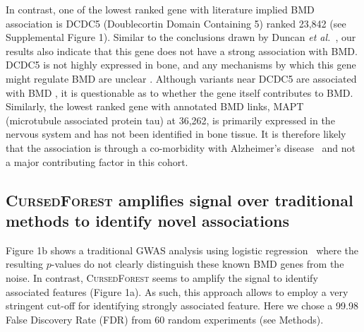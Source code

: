 \documentclass[10pt,letterpaper]{article}
\newcommand{\cursedforest}{\textsc{CursedForest}\xspace}
\begin{document}
In contrast, one of the lowest ranked gene with literature implied BMD association is DCDC5 (Doublecortin Domain Containing 5) ranked 23,842
(see Supplemental Figure 1). Similar to the conclusions drawn by Duncan {\it et
  al.}~\cite{Duncan.2011}, our results also indicate that this gene does not have a strong association with BMD. DCDC5 is not highly expressed in bone, and any mechanisms by which this gene might regulate BMD are unclear
\cite{Thakker2012}.  Although variants near DCDC5 are associated with BMD \cite{Rivadeneira2009}, it is questionable as
to whether the gene itself contributes to BMD.
Similarly, the lowest ranked gene with annotated BMD links, MAPT (microtubule associated protein tau) at 36,262, is primarily expressed in the nervous system and has not been identified in bone tissue. 
It is therefore likely that the association is through a co-morbidity with Alzheimer's disease~\cite{Dengler-Crish2017} and not a major contributing factor in this cohort. 


\subsection{\cursedforest amplifies signal over traditional methods to identify novel associations}

Figure 1b shows a traditional GWAS analysis using logistic regression~\cite{Duncan.2011} where the resulting $p$-values do not clearly distinguish these known BMD genes from the noise. 
In contrast, \cursedforest seems to amplify the signal to identify associated features (Figure 1a). 
As such, this approach allows to employ a very stringent cut-off for identifying strongly associated feature. Here we chose a 99.98 False Discovery Rate (FDR) from 60 random experiments (see Methods). 

\end{document}
